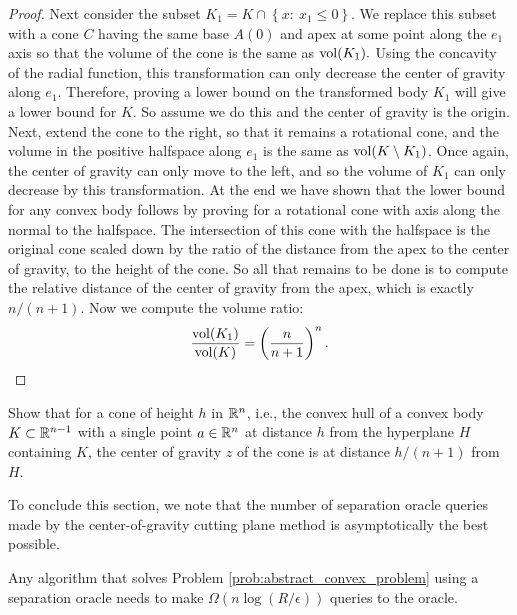 \begin{proof}
Next consider the subset $K_{1}=K\cap\left\{ x:\:x_{1}\le0\right\} $.
We replace this subset with a cone $C$ having the same base $A(0)$
and apex at some point along the $e_{1}$ axis so that the volume
of the cone is the same as $\mathrm{vol}(K_{1}).$ Using the concavity of
the radial function, this transformation can only decrease the center
of gravity along $e_{1}$. Therefore, proving a lower bound on the
transformed body $K_{1}$ will give a lower bound for $K$. So assume
we do this and the center of gravity is the origin. Next, extend the
cone to the right, so that it remains a rotational cone, and the volume
in the positive halfspace along $e_{1}$ is the same as $\mathrm{vol}(K\setminus K_{1})$.
Once again, the center of gravity can only move to the left, and so
the volume of $K_{1}$ can only decrease by this transformation. At
the end we have shown that the lower bound for any convex body follows
by proving for a rotational cone with axis along the normal to the
halfspace. The intersection of this cone with the halfspace is the
original cone scaled down by the ratio of the distance from the apex
to the center of gravity, to the height of the cone. So all that remains
to be done is to compute the relative distance of the center of gravity
from the apex, which is exactly $n/(n+1)$. Now we compute the volume
ratio:
\[
\frac{\mathrm{vol}(K_{1})}{\mathrm{vol}(K)}=\left(\frac{n}{n+1}\right)^{n}.
\]
\end{proof}
\begin{xca}
Show that for a cone of height $h$ in $\mathbb{R}^{n}$, i.e., the convex
hull of a convex body $K\subset\mathbb{R}^{n-1}$ with a single point $a\in\mathbb{R}^{n}$
at distance $h$ from the hyperplane $H$ containing $K$, the center
of gravity $z$ of the cone is at distance $h/(n+1)$ from $H$.
\end{xca}

To conclude this section, we note that the number of separation oracle
queries made by the center-of-gravity cutting plane method is asymptotically
the best possible.
\begin{thm}
Any algorithm that solves Problem \ref{prob:abstract_convex_problem}
using a separation oracle needs to make $\Omega(n\log(R/\epsilon))$
queries to the oracle.
\end{thm}

